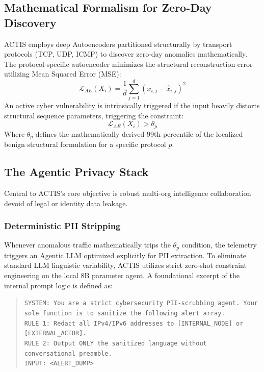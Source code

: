 \documentclass[conference]{IEEEtran}
\begin{document}
\subsection{Mathematical Formalism for Zero-Day Discovery}
ACTIS employs deep Autoencoders partitioned structurally by transport protocols (TCP, UDP, ICMP) to discover zero-day anomalies mathematically. The protocol-specific autoencoder minimizes the structural reconstruction error utilizing Mean Squared Error (MSE):
\begin{equation}
\mathcal{L}_{AE}(X_i) = \frac{1}{d} \sum_{j=1}^{d} \left(x_{i,j} - \hat{x}_{i,j}\right)^2
\end{equation}
An active cyber vulnerability is intrinsically triggered if the input heavily distorts structural sequence parameters, triggering the constraint:
\begin{equation}
\mathcal{L}_{AE}(X_i) > \theta_p
\end{equation}
Where $\theta_p$ defines the mathematically derived 99th percentile of the localized benign structural formulation for a specific protocol $p$.

\subsection{The Agentic Privacy Stack}
Central to ACTIS's core objective is robust multi-org intelligence collaboration devoid of legal or identity data leakage.

\subsubsection{Deterministic PII Stripping} Whenever anomalous traffic mathematically trips the $\theta_p$ condition, the telemetry triggers an Agentic LLM optimized explicitly for PII extraction. To eliminate standard LLM linguistic variability, ACTIS utilizes strict zero-shot constraint engineering on the local 8B parameter agent. A foundational excerpt of the internal prompt logic is defined as:
\begin{quote}
\texttt{SYSTEM: You are a strict cybersecurity PII-scrubbing agent. Your sole function is to sanitize the following alert array.\\
RULE 1: Redact all IPv4/IPv6 addresses to [INTERNAL\_NODE] or [EXTERNAL\_ACTOR].\\
RULE 2: Output ONLY the sanitized language without conversational preamble.\\
INPUT: \textless{}ALERT\_DUMP\textgreater{}}
\end{quote}
\end{document}
